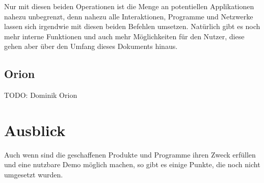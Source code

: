 \documentclass[a4paper,11pt,titlepage,twoside]{memoir}
\begin{document}
\noindent Nur mit diesen beiden Operationen ist die Menge an
potentiellen Applikationen nahezu unbegrenzt, denn nahezu alle
Interaktionen, Programme und Netzwerke lassen sich irgendwie mit
diesen beiden Befehlen umsetzen. Natürlich gibt es noch mehr interne
Funktionen und auch mehr Möglichkeiten für den Nutzer, diese gehen
aber über den Umfang dieses Dokuments hinaus.
\section{Orion}
\label{sec:org64ba0c1}
TODO: Dominik Orion
\chapter{Ausblick}
\label{sec:org959e2c6}
Auch wenn sind die geschaffenen Produkte und Programme ihren Zweck
erfüllen und eine nutzbare Demo möglich machen, so gibt es einige
Punkte, die noch nicht umgesetzt wurden.
\end{document}
